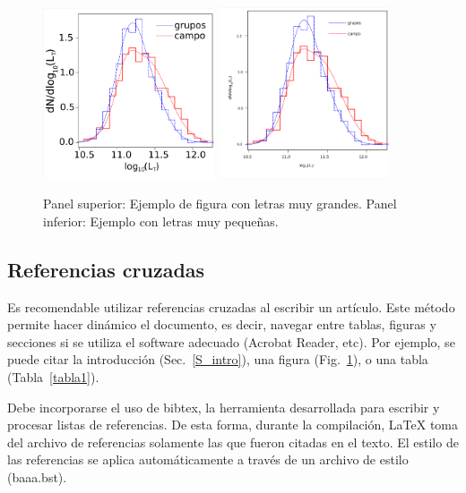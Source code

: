 \documentclass[baaa]{baaa}
\begin{document}
\begin{figure}[!t]
  \centering
  \includegraphics[width=0.45\textwidth]{fig_01.pdf}
  \includegraphics[width=0.45\textwidth]{fig_02.pdf}
  \caption{Panel superior: Ejemplo de figura con letras muy grandes.
           Panel inferior: Ejemplo con letras muy pequeñas.
}
  \label{F_letras}
\end{figure}
                       

\subsection{Referencias cruzadas}
\label{ref}

Es recomendable utilizar referencias cruzadas al escribir un artículo.  Este método permite 
hacer dinámico el documento, es decir, navegar entre tablas, figuras y secciones si se utiliza el
software adecuado (Acrobat Reader, etc).
%
Por ejemplo, se puede citar la introducción (Sec.~\ref{S_intro}),
una figura (Fig.~\ref{F_letras}), o una tabla (Tabla~\ref{tabla1}).

Debe incorporarse el uso de {\sc bibtex}, la herramienta desarrollada para escribir y procesar 
listas de referencias. De esta forma, durante la compilación, \LaTeX{} toma del archivo de
referencias solamente las que fueron citadas en el texto. El estilo de las referencias se aplica 
automáticamente a través de un archivo de estilo (baaa.bst).
\end{document}
